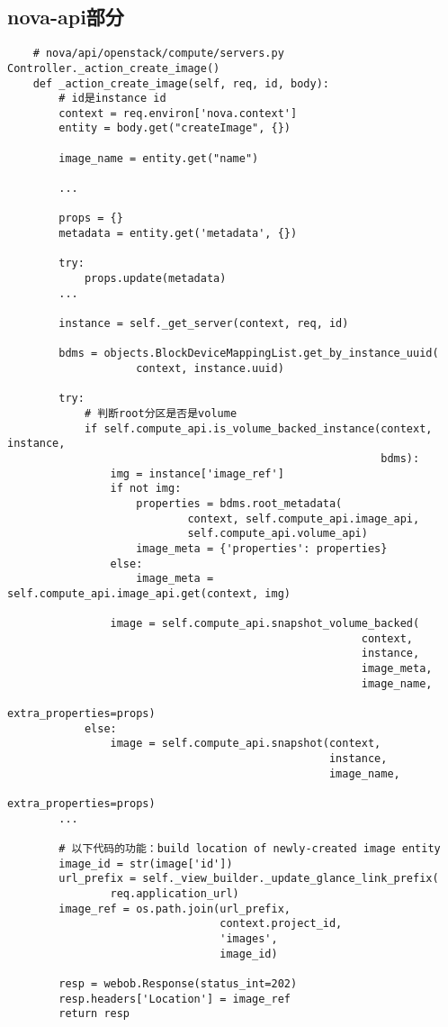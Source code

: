 \documentclass[a4paper,left=1.5cm,right=1.5cm,11pt]{article}
\begin{document}
\subsection{nova-api部分}
    \begin{lstlisting}
    # nova/api/openstack/compute/servers.py Controller._action_create_image()
    def _action_create_image(self, req, id, body):
        # id是instance id
        context = req.environ['nova.context']
        entity = body.get("createImage", {})

        image_name = entity.get("name")

        ...

        props = {}
        metadata = entity.get('metadata', {})
        
        try:
            props.update(metadata)
        ...

        instance = self._get_server(context, req, id)

        bdms = objects.BlockDeviceMappingList.get_by_instance_uuid(
                    context, instance.uuid)

        try:
            # 判断root分区是否是volume
            if self.compute_api.is_volume_backed_instance(context, instance,
                                                          bdms):
                img = instance['image_ref']
                if not img:
                    properties = bdms.root_metadata(
                            context, self.compute_api.image_api,
                            self.compute_api.volume_api)
                    image_meta = {'properties': properties}
                else:
                    image_meta = self.compute_api.image_api.get(context, img)

                image = self.compute_api.snapshot_volume_backed(
                                                       context,
                                                       instance,
                                                       image_meta,
                                                       image_name,
                                                       extra_properties=props)
            else:
                image = self.compute_api.snapshot(context,
                                                  instance,
                                                  image_name,
                                                  extra_properties=props)
        ...

        # 以下代码的功能：build location of newly-created image entity
        image_id = str(image['id'])
        url_prefix = self._view_builder._update_glance_link_prefix(
                req.application_url)
        image_ref = os.path.join(url_prefix,
                                 context.project_id,
                                 'images',
                                 image_id)

        resp = webob.Response(status_int=202)
        resp.headers['Location'] = image_ref
        return resp
    \end{lstlisting}
\end{document}

